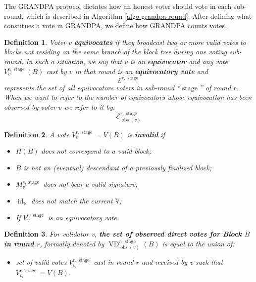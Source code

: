 \documentclass{book}
\newcommand{\nosymbol}{}
\newcommand{\tmop}[1]{\ensuremath{\operatorname{#1}}}
\newcommand{\tmstrong}[1]{\textbf{#1}}
\newcommand{\tmtextbf}[1]{{\bfseries{#1}}}
\newcommand{\tmtexttt}[1]{{\ttfamily{#1}}}
\newcommand{\tmverbatim}[1]{{\ttfamily{#1}}}
\newenvironment{itemizedot}{\begin{itemize} \renewcommand{\labelitemi}{$\bullet$}\renewcommand{\labelitemii}{$\bullet$}\renewcommand{\labelitemiii}{$\bullet$}\renewcommand{\labelitemiv}{$\bullet$}}{\end{itemize}}
\newtheorem{definition}{Definition}
\providecommand{\nosymbol}{}
\providecommand{\tmop}[1]{\ensuremath{\mathrm{#1}}}
\providecommand{\tmstrong}[1]{\tmtextbf{#1}}
\providecommand{\tmtextbf}[1]{\tmtextbf{#1}}
\providecommand{\tmverbatim}[1]{\tmtexttt{#1}}
\newtheorem{definition}{Definition}
\begin{document}
The GRANDPA protocol dictates how an honest voter should vote in each
sub-round, which is described in Algorithm \ref{algo-grandpa-round}. After
defining what constitues a vote in GRANDPA, we define how GRANDPA counts
votes.

\begin{definition}
  Voter $v$ {\tmstrong{equivocates}} if they broadcast two or more valid votes
  to blocks not residing on the same branch of the block tree during one
  voting sub-round. In such a situation, we say that $v$ is an
  {\tmstrong{equivocator}} and any vote $V_v^{r, \tmop{stage}} (B)$ cast by
  $v$ in that round is an {\tmstrong{equivocatory vote}} and
  \[ \mathcal{E}^{r, \tmop{stage}} \]
  represents the set of all equivocators voters in sub-round
  ``$\tmop{stage}$'' of round $r$. When we want to refer to the number
  of\tmverbatim{} equivocators whose equivocation has been observed by voter
  $v$ we refer to it by:
  \[ \mathcal{E}^{r, \tmop{stage}}_{\tmop{obs} (v)} \]
  
\end{definition}

\begin{definition}
  A vote $V_v^{r, \tmop{stage}} = V (B)$ is {\tmstrong{invalid}} if
  \begin{itemize}
    \begin{itemizedot}
      \item $H (B)$ does not correspond to a valid block;
      
      \item $B$ is not an (eventual) descendant of a previously finalized
      block;
      
      \item $M^{r, \tmop{stage}}_v$ does not bear a valid signature;
      
      \item $\tmop{id}_{\mathbb{V}}$ does not match the current $\mathbb{V}$;
      
      \item If $V_v^{r, \tmop{stage}}$ is an equivocatory vote.
    \end{itemizedot}
  \end{itemize}
\end{definition}

\begin{definition}
  For validator v, {\tmstrong{the set of observed direct votes for Block $B$
  in round $r$}}, formally denoted by $\tmop{VD}^{r, \tmop{stage}}_{\tmop{obs}
  (v)}^{\nosymbol}_{\nosymbol} (B)$ is equal to the union of:
  \begin{itemizedot}
    \item set of valid votes $V^{r, \tmop{stage}}_{v_i}$ cast in round $r$ and
    received by v such that $V^{r, \tmop{stage}}_{v_i} = V (B)$.
  \end{itemizedot}
\end{definition}
\end{document}
